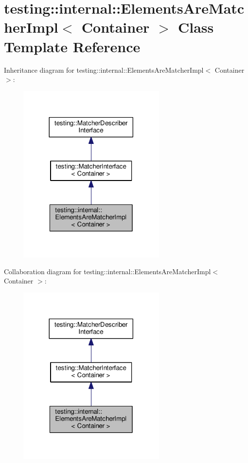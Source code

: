 \hypertarget{classtesting_1_1internal_1_1ElementsAreMatcherImpl}{}\section{testing\+:\+:internal\+:\+:Elements\+Are\+Matcher\+Impl$<$ Container $>$ Class Template Reference}
\label{classtesting_1_1internal_1_1ElementsAreMatcherImpl}


Inheritance diagram for testing\+:\+:internal\+:\+:Elements\+Are\+Matcher\+Impl$<$ Container $>$\+:\nopagebreak
\begin{figure}[H]
\begin{center}
\leavevmode
\includegraphics[width=209pt]{classtesting_1_1internal_1_1ElementsAreMatcherImpl__inherit__graph}
\end{center}
\end{figure}


Collaboration diagram for testing\+:\+:internal\+:\+:Elements\+Are\+Matcher\+Impl$<$ Container $>$\+:\nopagebreak
\begin{figure}[H]
\begin{center}
\leavevmode
\includegraphics[width=209pt]{classtesting_1_1internal_1_1ElementsAreMatcherImpl__coll__graph}
\end{center}
\end{figure}

